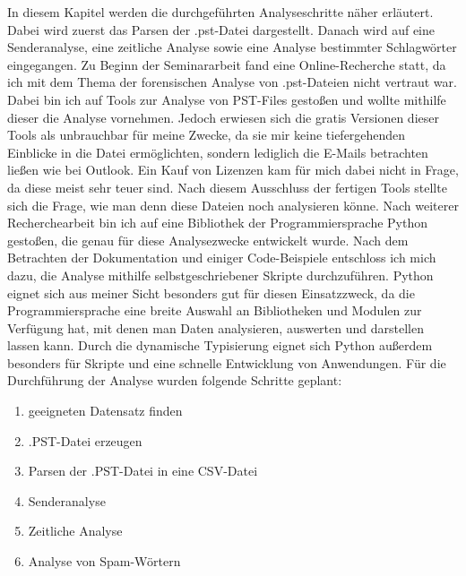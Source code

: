 In diesem Kapitel werden die durchgeführten Analyseschritte näher erläutert. Dabei wird zuerst das Parsen der .pst-Datei dargestellt. Danach wird auf eine Senderanalyse, eine zeitliche Analyse sowie eine Analyse bestimmter Schlagwörter eingegangen. Zu Beginn der Seminararbeit fand eine Online-Recherche statt, da ich mit dem Thema der forensischen Analyse von .pst-Dateien nicht vertraut war. Dabei bin ich auf Tools zur Analyse von PST-Files gestoßen und wollte mithilfe dieser die Analyse vornehmen. Jedoch erwiesen sich die gratis Versionen dieser Tools als unbrauchbar für meine Zwecke, da sie mir keine tiefergehenden Einblicke in die Datei ermöglichten, sondern lediglich die E-Mails betrachten ließen wie bei Outlook. Ein Kauf von Lizenzen kam für mich dabei nicht in Frage, da diese meist sehr teuer sind. Nach diesem Ausschluss der fertigen Tools stellte sich die Frage, wie man denn diese Dateien noch analysieren könne. Nach weiterer Recherchearbeit bin ich auf eine Bibliothek der Programmiersprache Python gestoßen, die genau für diese Analysezwecke entwickelt wurde. Nach dem Betrachten der Dokumentation und einiger Code-Beispiele entschloss ich mich dazu, die Analyse mithilfe selbstgeschriebener Skripte durchzuführen. Python eignet sich aus meiner Sicht besonders gut für diesen Einsatzzweck, da die Programmiersprache eine breite Auswahl an Bibliotheken und Modulen zur Verfügung hat, mit denen man Daten analysieren, auswerten und darstellen lassen kann. Durch die dynamische Typisierung eignet sich Python außerdem besonders für Skripte und eine schnelle Entwicklung von Anwendungen. Für die Durchführung der Analyse wurden folgende Schritte geplant:

\begin{enumerate}
    \item geeigneten Datensatz finden
    \item .PST-Datei erzeugen 
    \item Parsen der .PST-Datei in eine CSV-Datei
    \item Senderanalyse
    \item Zeitliche Analyse
    \item Analyse von Spam-Wörtern
\end{enumerate}